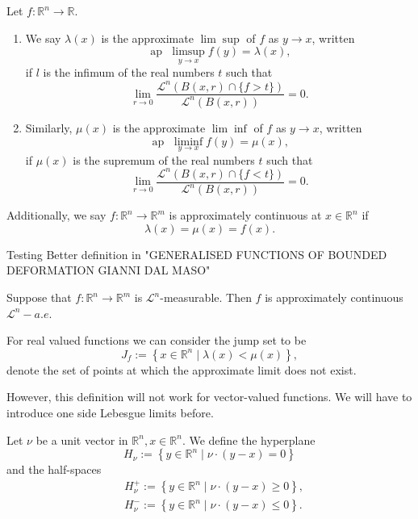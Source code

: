 \begin{definition}
 Let $f: \mathbb{R}^n \rightarrow \mathbb{R}$.
\begin{enumerate}
     \item  We say $\lambda(x)$ is the approximate $\lim \sup$ of $f$ as $y \rightarrow x$, written $$\operatorname{ap\ }\limsup _{y \rightarrow x} f(y)=\lambda(x),$$
if $l$ is the infimum of the real numbers $t$ such that
$$
\lim _{r \rightarrow 0} \frac{\mathcal{L}^n(B(x, r) \cap\{f>t\})}{\mathcal{L}^n(B(x, r))}=0 .
$$
\item Similarly, $\mu(x)$ is the approximate $\lim \inf$ of $f$ as $y \rightarrow x$, written 
$$\operatorname{ap\ } \liminf _{y \rightarrow x} f(y)=\mu(x),$$
if $\mu(x)$ is the supremum of the real numbers $t$ such that
$$
\lim _{r \rightarrow 0} \frac{\mathcal{L}^n(B(x, r) \cap\{f<t\})}{\mathcal{L}^n(B(x, r))}=0 .
$$
 \end{enumerate}
Additionally,  we say $f: \mathbb{R}^n \rightarrow \mathbb{R}^m$ is approximately continuous at $x \in \mathbb{R}^n$ if
$$
\lambda(x) =\mu(x) =f(x).
$$
\end{definition}
Testing  
Better definition in "GENERALISED FUNCTIONS OF BOUNDED DEFORMATION
GIANNI DAL MASO"
\begin{theorem} Suppose that $f: \mathbb{R}^n \rightarrow \mathbb{R}^m$ is $\mathcal{L}^n$-measurable.
Then $f$ is approximately continuous $\mathcal{L}^n-a . e$.
\end{theorem}
For real valued functions we can consider the jump set to be 
$$
J_f:=\left\{x \in \mathbb{R}^n \mid \lambda(x)<\mu(x)\right\},
$$
denote the set of points at which the approximate limit does not exist.


However, this definition will not work for vector-valued functions. We will have to introduce one side Lebesgue limits before.

\begin{definition} Let $\nu$ be a unit vector in $\mathbb{R}^n, x \in \mathbb{R}^n$. We define the hyperplane
$$
H_\nu:=\left\{y \in \mathbb{R}^n \mid \nu \cdot(y-x)=0\right\}
$$
and the half-spaces
$$
\begin{aligned}
&H_\nu^{+}:=\left\{y \in \mathbb{R}^n \mid \nu \cdot(y-x) \geq 0\right\}, \\
&H_\nu^{-}:=\left\{y \in \mathbb{R}^n \mid \nu \cdot(y-x) \leq 0\right\} .
\end{aligned}
$$
\end{definition}

